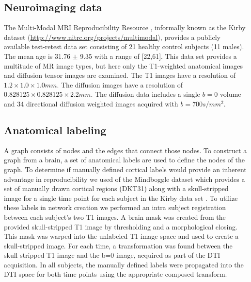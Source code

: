 \documentclass{frontiersSCNS} %
\begin{document}
\subsection{Neuroimaging data}
The Multi-Modal MRI Reproducibility Resource \citep{Landman2011},
informally known as the Kirby dataset (\url{http://www.nitrc.org/projects/multimodal}), 
provides a publicly available test-retest data set consisting of 21
healthy control subjects (11 males). The mean
age is 31.76 $\pm$ 9.35 with a range of [22,61]. This data set provides a
multitude of MR image types, but here only the T1-weighted anatomical images and diffusion
tensor images are examined. The T1 images have a resolution of
$1.2 \times 1.0 \times 1.0 mm$. The diffusion images have a resolution of
$0.828125 \times 0.828125 \times 2.2mm$. The diffusion data includes a single $b=0$
volume and 34 directional diffusion weighted images acquired with
$b=700 s/mm^2$. 

\subsection{Anatomical labeling}
A graph consists of nodes and the edges that connect those nodes. To construct a graph from a brain, a set of anatomical labels
are used to define the nodes of the graph. To determine if manually defined cortical labels would provide an inherent advantage in
reproducibility we used of the Mindboggle dataset which provides a set of manually drawn cortical regions (DKT31) 
along with a skull-stripped image for a single time point for each subject in the Kirby data set \citep{Klein2012}. 
To utilize these labels in network creation we performed an intra subject registration between each subject's two T1 images. 
A brain mask was created from the provided skull-stripped T1 image by thresholding and a morphological closing. This mask
was warped into the unlabeled T1 image space and used to create a skull-stripped image. For each time, a transformation was found
between the skull-stripped T1 image and the b=0 image, acquired as part of the DTI acquisition. In all subjects, the manually defined
labels were propagated into the DTI space for both time points using the appropriate composed transform. 
\end{document}

